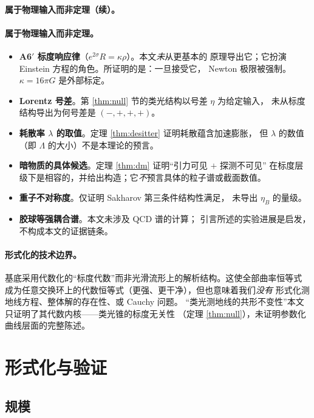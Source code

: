 \documentclass[11pt,a4paper]{article}
\theoremstyle{sudef}
\begin{document}
\paragraph{属于物理输入而非定理（续）。}

\paragraph{属于物理输入而非定理。}
\begin{itemize}[leftmargin=1.6em]
\item \textbf{A6$'$ 标度响应律}（$e^{2\sigma}R=\kappa\rho$）。本文\emph{未}从更基本的
      原理导出它；它扮演 Einstein 方程的角色。所证明的是：一旦接受它，
      Newton 极限被强制。$\kappa=16\pi G$ 是外部标定。
\item \textbf{Lorentz 号差}。第 \ref{thm:null} 节的类光结构以号差 $\eta$ 为给定输入，
      未从标度结构导出为何号差是 $(-,+,+,+)$。
\item \textbf{耗散率 $\lambda$ 的取值}。定理 \ref{thm:desitter} 证明耗散蕴含加速膨胀，
      但 $\lambda$ 的数值（即 $\Lambda$ 的大小）不是本理论的预言。
\item \textbf{暗物质的具体候选}。定理 \ref{thm:dm} 证明“引力可见 $+$ 探测不可见”
      在标度层级下是相容的，并给出构造；它\emph{不}预言具体的粒子谱或截面数值。
\item \textbf{重子不对称度}。仅证明 Sakharov 第三条件结构性满足，
      未导出 $\eta_B$ 的量级。
\item \textbf{胶球等强耦合谱}。本文未涉及 QCD 谱的计算；
      引言所述的实验进展是启发，不构成本文的证据链条。
\end{itemize}

\paragraph{形式化的技术边界。}
基底采用代数化的“标度代数”而非光滑流形上的解析结构。这使全部曲率恒等式
成为任意交换环上的代数恒等式（更强、更干净），但也意味着我们\emph{没有}
形式化测地线方程、整体解的存在性、或 Cauchy 问题。
“类光测地线的共形不变性”本文只证明了其代数内核——类光锥的标度无关性
（定理 \ref{thm:null}），未证明参数化曲线层面的完整陈述。

\section{形式化与验证}

\subsection{规模}
\end{document}
